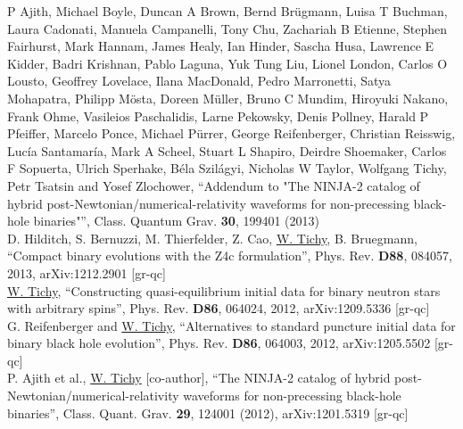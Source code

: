 P Ajith, Michael Boyle, Duncan A Brown, Bernd Brügmann, Luisa T Buchman,
Laura Cadonati, Manuela Campanelli, Tony Chu, Zachariah B Etienne,
Stephen Fairhurst, Mark Hannam, James Healy, Ian Hinder, Sascha Husa,
Lawrence E Kidder, Badri Krishnan, Pablo Laguna, Yuk Tung Liu, Lionel London,
Carlos O Lousto, Geoffrey Lovelace, Ilana MacDonald, Pedro Marronetti,
Satya Mohapatra, Philipp Mösta, Doreen Müller, Bruno C Mundim,
Hiroyuki Nakano, Frank Ohme, Vasileios Paschalidis, Larne Pekowsky,
Denis Pollney, Harald P Pfeiffer, Marcelo Ponce, Michael Pürrer,
George Reifenberger, Christian Reisswig, Lucía Santamaría, Mark A Scheel,
Stuart L Shapiro, Deirdre Shoemaker, Carlos F Sopuerta, Ulrich Sperhake,
Béla Szilágyi, Nicholas W Taylor, Wolfgang Tichy,
Petr Tsatsin and Yosef Zlochower,
``Addendum to "The NINJA-2 catalog of hybrid
post-Newtonian/numerical-relativity waveforms for non-precessing black-hole
binaries"'',
Class. Quantum Grav. {\bf 30}, 199401 (2013)
\\

D. Hilditch, S. Bernuzzi, M. Thierfelder, Z. Cao,
\underline{W. Tichy}, B. Bruegmann,
``Compact binary evolutions with the Z4c formulation'',
Phys. Rev. {\bf D88},  084057, 2013,
arXiv:1212.2901 [gr-qc]
\\

\underline{W. Tichy},
``Constructing quasi-equilibrium initial data for binary neutron stars
with arbitrary spins'', Phys. Rev. {\bf D86}, 064024, 2012,
arXiv:1209.5336 [gr-qc]
\\

G. Reifenberger and \underline{W. Tichy},
``Alternatives to standard puncture initial data for binary black hole
evolution'', Phys. Rev. {\bf D86}, 064003, 2012,
arXiv:1205.5502 [gr-qc]
\\

P. Ajith et al., \underline{W. Tichy} [co-author],
``The NINJA-2 catalog of hybrid post-Newtonian/numerical-relativity
waveforms for non-precessing black-hole binaries'',
Class. Quant. Grav. {\bf 29}, 124001 (2012), arXiv:1201.5319 [gr-qc]
\\

